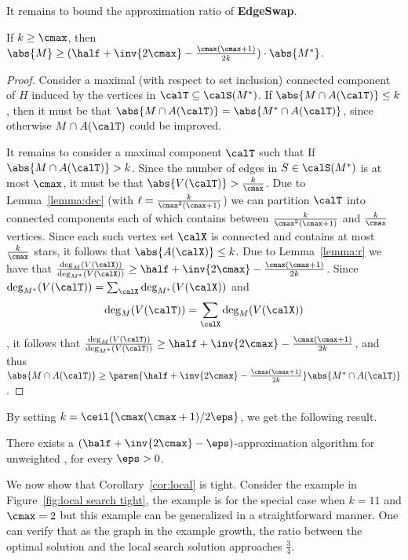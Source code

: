 \fi %

It remains to bound the approximation ratio of \textbf{EdgeSwap}.

\begin{lemma}
If $k \geq \cmax$, then $\abs{M} \geq (\half + \inv{2\cmax}
- \frac{\cmax(\cmax+1)}{2k}) \cdot \abs{M^*}$.
\end{lemma}
\begin{proof}
Consider a maximal (with respect to set inclusion) connected component
of $H$ induced by the vertices in $\calT \subseteq \calS(M^*)$.
%
If $\abs{M \cap A(\calT)} \leq k$, then it must be that $\abs{M \cap
A(\calT)} = \abs{M^* \cap A(\calT)}$, since otherwise $M \cap
A(\calT)$ could be improved.

It remains to consider a maximal component $\calT$ such that If
$\abs{M \cap A(\calT)} > k$.  Since the number of edges in
$S \in \calS(M^*)$ is at most $\cmax$, it must be that $\abs{V(\calT)}
> \frac{k}{\cmax}$.
%
Due to Lemma~\ref{lemma:dec} (with $\ell
= \frac{k}{\cmax^2(\cmax+1)}$) we can partition $\calT$ into connected
components each of which contains between $\frac{k}{\cmax^2(\cmax+1)}$
and $\frac{k}{\cmax}$ vertices.
%
Since each such vertex set $\calX$ is connected and contains at most
$\frac{k}{\cmax}$ stars, it follows that $\abs{A(\calX)} \leq k$.
%
Due to Lemma~\ref{lemma:r} we have that
\(
\frac{\deg_M(V(\calX))}{\deg_{M^*}(V(\calX))} 
\geq \half + \inv{2\cmax} - \frac{\cmax(\cmax+1)}{2k}
\).
Since $\deg_{M^*}(V(\calT)) = \sum_{\calX} \deg_{M^*}(V(\calX))$ 
and
$$\deg_M(V(\calT)) = \sum_{\calX} \deg_M(V(\calX))$$, 
it follows that
\(
\frac{\deg_M(V(\calT))}{\deg_{M^*}(V(\calT))}
\geq \half + \inv{2\cmax} - \frac{\cmax(\cmax+1)}{2k}
\),
and thus
\(
\abs{M \cap A(\calT)}
\geq \paren{ \half + \inv{2\cmax} -
             \frac{\cmax(\cmax+1)}{2k}} \abs{M^* \cap A(\calT)}
\).
\end{proof}

By setting $k = \ceil{\cmax(\cmax+1)/2\eps}$, we get the following
result.

\begin{corollary}
\label{cor:local}
There exists a $(\half + \inv{2\cmax} - \eps)$-approximation algorithm
for unweighted \carpool, for every $\eps>0$.
\end{corollary}

We now show that Corollary~\ref{cor:local} is tight.  
Consider the
example in Figure~\ref{fig:local search tight}, the example is for the
special case when $k = 11$ and $\cmax = 2$ but this example can be
generalized in a straightforward manner.  One can verify that as the
graph in the example growth, the ratio between the optimal solution
and the local search solution approaches $\frac{3}{4}$.

